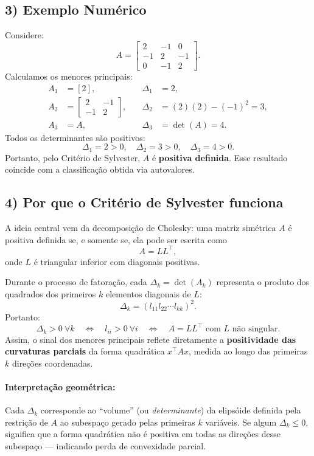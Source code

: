 \documentclass[9pt,a4paper]{extarticle}
\begin{document}
\subsection*{3) Exemplo Num\'erico}
Considere:
\[
A =
\begin{bmatrix}
2 & -1 & 0 \\
-1 & 2 & -1 \\
0 & -1 & 2
\end{bmatrix}.
\]
Calculamos os menores principais:
\[
\begin{aligned}
A_1 &= [2], & \quad \Delta_1 &= 2,\\
A_2 &= 
\begin{bmatrix}
2 & -1\\
-1 & 2
\end{bmatrix}, & \quad \Delta_2 &= (2)(2) - (-1)^2 = 3,\\
A_3 &= A, & \quad \Delta_3 &= \det(A) = 4.
\end{aligned}
\]
Todos os determinantes s\~ao positivos:
\[
\Delta_1 = 2 > 0, \quad \Delta_2 = 3 > 0, \quad \Delta_3 = 4 > 0.
\]
Portanto, pelo Crit\'erio de Sylvester, $A$ \'e \textbf{positiva definida}.  
Esse resultado coincide com a classifica\c c\~ao obtida via autovalores.

\subsection*{4) Por que o Crit\'erio de Sylvester funciona}

A ideia central vem da decomposi\c c\~ao de Cholesky:  
uma matriz sim\'etrica $A$ \'e positiva definida se, e somente se, ela pode ser escrita como
\[
A = L L^\top,
\]
onde $L$ \'e triangular inferior com diagonais positivas.

Durante o processo de fatora\c c\~ao, cada $\Delta_k = \det(A_k)$ representa o produto dos quadrados dos primeiros $k$ elementos diagonais de $L$:
\[
\Delta_k = (l_{11} l_{22} \cdots l_{kk})^2.
\]
Portanto:
\[
\Delta_k > 0 \ \forall k \quad \Longleftrightarrow \quad l_{ii} > 0 \ \forall i \quad \Longleftrightarrow \quad A = L L^\top \text{ com } L \text{ n\~ao singular.}
\]
Assim, o sinal dos menores principais reflete diretamente a \textbf{positividade das curvaturas parciais} da forma quadr\'atica $x^\top A x$, medida ao longo das primeiras $k$ dire\c c\~oes coordenadas.

\paragraph{Interpreta\c c\~ao geom\'etrica:}
Cada $\Delta_k$ corresponde ao “volume” (ou \textit{determinante}) da elips\'oide definida pela restri\c c\~ao de $A$ ao subespa\c co gerado pelas primeiras $k$ vari\'aveis.  
Se algum $\Delta_k \le 0$, significa que a forma quadr\'atica n\~ao \'e positiva em todas as dire\c c\~oes desse subespa\c co — indicando perda de convexidade parcial.
\end{document}
